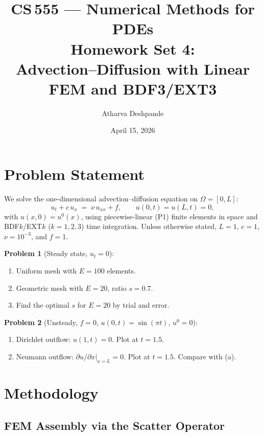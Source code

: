 \documentclass[11pt]{article}
\title{\textbf{CS\,555 --- Numerical Methods for PDEs}\\[4pt]
       Homework Set 4:\\[2pt]
       Advection--Diffusion with Linear FEM and BDF3/EXT3}
\author{Atharva Deshpande}
\date{April 15, 2026}
\begin{document}
\maketitle
\thispagestyle{empty}

\section{Problem Statement}

We solve the one-dimensional advection--diffusion equation on $\Omega = [0,L]$:
\begin{equation}\label{eq:pde}
  u_t + c\,u_x \;=\; \nu\,u_{xx} + f,
  \qquad u(0,t) = u(L,t) = 0,
\end{equation}
with $u(x,0) = u^0(x)$, using piecewise-linear (P1) finite elements in space
and BDF$k$/EXT$k$ ($k=1,2,3$) time integration.
Unless otherwise stated, $L=1$, $c=1$, $\nu=10^{-3}$, and $f=1$.

\medskip
\noindent\textbf{Problem 1} (Steady state, $u_t=0$):
\begin{enumerate}[label=(\alph*),nosep]
  \item Uniform mesh with $E=100$ elements.
  \item Geometric mesh with $E=20$, ratio $s=0.7$.
  \item Find the optimal $s$ for $E=20$ by trial and error.
\end{enumerate}

\noindent\textbf{Problem 2} (Unsteady, $f=0$, $u(0,t)=\sin(\pi t)$, $u^0=0$):
\begin{enumerate}[label=(\alph*),nosep]
  \item Dirichlet outflow: $u(1,t)=0$.  Plot at $t=1.5$.
  \item Neumann outflow: $\partial u/\partial x\big|_{x=L}=0$.  Plot at $t=1.5$.  Compare with (a).
\end{enumerate}

\section{Methodology}

\subsection{FEM Assembly via the Scatter Operator}
\end{document}
